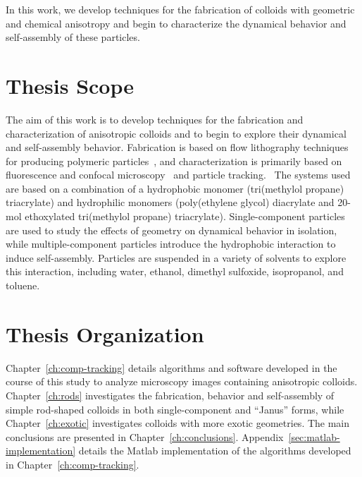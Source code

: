 In this work, we develop techniques for
the fabrication of colloids with geometric and chemical anisotropy and begin to characterize the dynamical behavior
and self-assembly of these particles.

\section{Thesis Scope}

The aim of this work is to develop techniques for the fabrication and characterization of anisotropic colloids and to begin
to explore their dynamical and self-assembly behavior.  Fabrication is based on flow lithography
techniques for producing polymeric particles~\cite{dendukuri-cfl, dendukuri-sfl}, 
and characterization is primarily based on fluorescence and confocal 
microscopy~\cite{weitz-confocal} and particle 
tracking.~\cite{crocker-grier-spheres,rods-mohraz}
The systems used are based on a combination of a hydrophobic monomer (tri(methylol propane) triacrylate) and hydrophilic 
monomers (poly(ethylene glycol) diacrylate and 20-mol ethoxylated tri(methylol propane) triacrylate). 
Single-component particles are used to study the effects of
geometry on dynamical behavior in isolation, while multiple-component particles introduce 
the hydrophobic interaction to induce self-assembly.  Particles are suspended in a 
variety of solvents to explore this interaction, including
water, ethanol, dimethyl sulfoxide, isopropanol, and toluene.

\section{Thesis Organization}

Chapter~\ref{ch:comp-tracking}
details algorithms and software developed in the course of this study to analyze microscopy images containing 
anisotropic colloids.  Chapter~\ref{ch:rods} investigates the fabrication, behavior and self-assembly of simple rod-shaped colloids
in both single-component and ``Janus'' forms, while Chapter~\ref{ch:exotic} 
investigates colloids with more exotic geometries. The main
conclusions are presented in Chapter~\ref{ch:conclusions}.  
Appendix~\ref{sec:matlab-implementation} details the Matlab implementation of the algorithms developed in
Chapter~\ref{ch:comp-tracking}.
